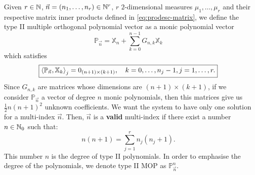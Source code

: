 \documentclass[portrait,final,a0paper,fontscale=0.38]{baposter}
\begin{document}
\begin{poster}
{%
	}
%
	{
  Given $r\in\mathbb{N}$, $\vec n = (n_1,\dots, n_r)\in\mathbb{N}^r$, $r$ $2$-dimensional measures $\mu_1, \dots, \mu_r$ and their respective matrix inner products defined in \eqref{eq:prodesc-matrix}, we define the type II multiple orthogonal polynomial vector as a monic polynomial vector $$\mathbb P_{\vec n} = \mathbb X_n + \displaystyle\sum_{k=0}^{n-1}G_{n,k} \mathbb X_k$$ which satisfies
\begin{equation}
    \label{eq:typeII-MOP-d-variables}
    \boxed{
    \left\langle \mathbb P_{\vec n} , \mathbb X_k \right\rangle_j = 0_{(n+1)\times (k+1)}, \ \ \ k=0,\dots,n_j-1, j=1,\dots,r.}
\end{equation}
Since $G_{n,k}$ are matrices whose dimensions are $(n+1)\times (k+1)$, if we consider $\mathbb P_{\vec n}$ a vector of degree $n$ monic polynomials, then this matrices give us $\frac 1 2 n (n+1)^2 $ unknown coefficients. We want the system to have only one solution for a multi-index $\vec n$. Then, $\vec n$ is a \textbf{valid} multi-index if there exist a number $n\in\mathbb{N}_0$ such that:
\begin{equation}
    \label{eq:condition-type-ii}
    \boxed{n(n+1) = \sum_{j=1}^r n_j (n_j+1).}
\end{equation}
This number $n$ is the degree of type II polynomials. In order to emphasise the degree of the polynomials, we denote type II MOP as $\mathbb P_{\vec n}^n$.

}


\end{poster}
\end{document}
